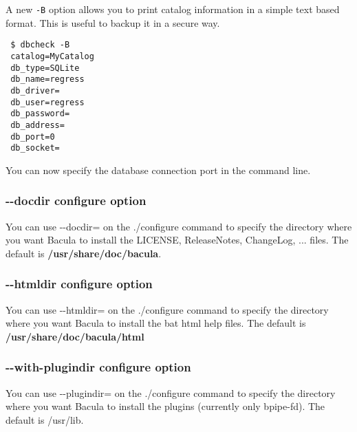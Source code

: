 A new \texttt{-B} option allows you to print catalog information in a simple
text based format. This is useful to backup it in a secure way.

\begin{verbatim}
 $ dbcheck -B 
 catalog=MyCatalog
 db_type=SQLite
 db_name=regress
 db_driver=
 db_user=regress
 db_password=
 db_address=
 db_port=0
 db_socket=
\end{verbatim} %

You can now specify the database connection port in the command line.

\subsubsection{{-}{-}docdir configure option}
You can use {-}{-}docdir= on the ./configure command to
specify the directory where you want Bacula to install the
LICENSE, ReleaseNotes, ChangeLog, ... files.   The default is 
{\bf /usr/share/doc/bacula}.
      
\subsubsection{{-}{-}htmldir configure option}
You can use {-}{-}htmldir= on the ./configure command to
specify the directory where you want Bacula to install the bat html help
files. The default is {\bf /usr/share/doc/bacula/html}

\subsubsection{{-}{-}with-plugindir configure option}
You can use {-}{-}plugindir= on the ./configure command to
specify the directory where you want Bacula to install
the plugins (currently only bpipe-fd). The default is
/usr/lib.
